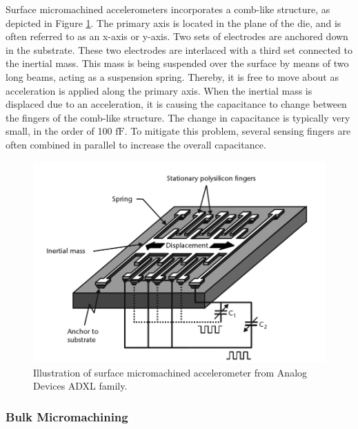 Surface micromachined accelerometers incorporates a comb-like structure, as depicted in Figure \ref{fig:surface_micromachined}. The primary axis is located in the plane of the die, and is often referred to as an x-axis or y-axis. Two sets of electrodes are anchored down in the substrate. These two electrodes are interlaced with a third set connected to the inertial mass. This mass is being suspended over the surface by means of two long beams, acting as a suspension spring. Thereby, it is free to move about as acceleration is applied along the primary axis. When the inertial mass is displaced due to an acceleration, it is causing the capacitance to change between the fingers of the comb-like structure. The change in capacitance is typically very small, in the order of 100 $\si{\femto\farad}$. To mitigate this problem, several sensing fingers are often combined in parallel to increase the overall capacitance.

\begin{figure}[h]
\centering
\includegraphics[scale=0.3]{fig/surface_micromachined.png}
\caption{Illustration of surface micromachined accelerometer from Analog Devices ADXL family. \cite[p.~101]{maluf04}}
\label{fig:surface_micromachined}
\end{figure}

\subsubsection{Bulk Micromachining}

